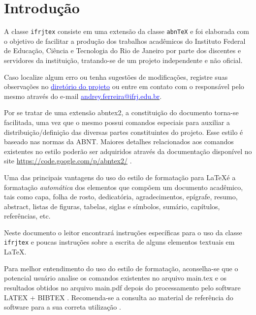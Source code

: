 %
%
\chapter{Introdução}
\label{chap:introducao}

A classe \texttt{ifrjtex} consiste em uma extensão da classe \texttt{abn\TeX} e foi elaborada com o objetivo de facilitar a produção dos trabalhos acadêmicos do Instituto Federal de Educação, Ciência e Tecnologia do Rio de Janeiro por parte dos discentes e servidores da instituição, tratando-se de um projeto independente e não oficial.

Caso localize algum erro ou tenha sugestões de modificações, registre suas observações no \href{https://github.com/andrey-ferreira/ifrjTeX}{\textcolor{blue}{diretório do projeto}} ou entre em contato com o responsável pelo mesmo através do e-mail \href{mailto:andrey.ferreira@ifrj.edu.br}{\textcolor{blue}{andrey.ferreira@ifrj.edu.br}}.

Por se tratar de uma extensão {\ttfamily abntex2},  a constituição do documento torna-se facilitada, uma vez que o mesmo possui comandos especiais para auxiliar a distribuição/definição das diversas partes constituintes do projeto.
Esse estilo é baseado nas normas da ABNT.
Maiores detalhes relacionados aos comandos existentes no estilo poderão ser adquiridos através da documentação disponível no site \href{https://code.google.com/p/abntex2/}{https://code.google.com/p/abntex2/} \cite{abntex2classe}.

Uma das principais vantagens do uso do estilo de formatação para \LaTeX é a formatação \textit{automática} dos elementos que compõem um documento acadêmico, tais como capa, folha de rosto, dedicatória, agradecimentos, epígrafe, resumo, abstract, listas de figuras, tabelas, siglas e símbolos, sumário, capítulos, referências, etc.

Neste documento o leitor encontrará instruções específicas para o uso da classe \texttt{ifrjtex} e poucas instruções sobre a escrita de alguns elementos textuais em \LaTeX. 

Para melhor entendimento do uso do estilo de formatação, aconselha-se que o potencial usuário analise os comandos existentes no arquivo {\ttfamily main.tex} e os resultados obtidos no arquivo {\ttfamily main.pdf} depois do processamento pelo software LATEX + BIBTEX \cite{LaTeX2009,BibTeX2009}.
Recomenda-se a consulta ao material de referência do software para a sua correta utilização \cite{Lamport1986,Buerger1989,Kopka2003,Mittelbach2004}.